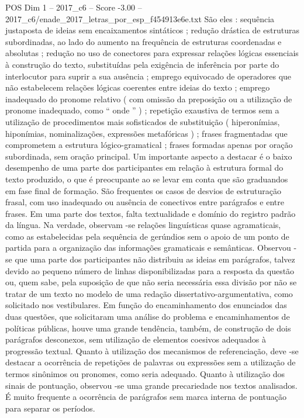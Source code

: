 \begin{textsample}{POS Dim 1 – 2017\_c6 – Score -3.00 – 2017\_c6/enade\_2017\_letras\_por\_esp\_f454913e6e.txt}
São eles : sequência justaposta de ideias sem encaixamentos sintáticos ; redução drástica de estruturas subordinadas, ao lado do aumento na frequência de estruturas coordenadas e absolutas ; redução no uso de conectores para expressar relações lógicas essenciais à construção do texto, substituídas pela exigência de inferência por parte do interlocutor para suprir a sua ausência ; emprego equivocado de operadores que não estabelecem relações lógicas coerentes entre ideias do texto ; emprego inadequado do pronome relativo ( com omissão da preposição ou a utilização de pronome inadequado, como “ onde ” ) ; repetição exaustiva de termos sem a utilização de procedimentos mais sofisticados de substituição ( hiperonímias, hiponímias, nominalizações, expressões metafóricas ) ; frases fragmentadas que comprometem a estrutura lógico-gramatical ; frases formadas apenas por oração subordinada, sem oração principal.
Um importante aspecto a destacar é o baixo desempenho de uma parte dos participantes em relação à estrutura formal do texto produzido, o que é preocupante ao se levar em conta que são graduandos em fase final de formação.
São frequentes os casos de desvios de estruturação frasal, com uso inadequado ou ausência de conectivos entre parágrafos e entre frases.
Em uma parte dos textos, falta textualidade e domínio do registro padrão da língua.
Na verdade, observam -se relações linguísticas quase agramaticais, como as estabelecidas pela sequência de gerúndios sem o apoio de um ponto de partida para a organização das informações gramaticais e semânticas.
Observou -se que uma parte dos participantes não distribuiu as ideias em parágrafos, talvez devido ao pequeno número de linhas disponibilizadas para a resposta da questão ou, quem sabe, pela suposição de que não seria necessária essa divisão por não se tratar de um texto no modelo de uma redação dissertativo-argumentativa, como solicitado nos vestibulares.
Em função do encaminhamento dos enunciados das duas questões, que solicitaram uma análise do problema e encaminhamentos de políticas públicas, houve uma grande tendência, também, de construção de dois parágrafos desconexos, sem utilização de elementos coesivos adequados à progressão textual.
Quanto à utilização dos mecanismos de referenciação, deve -se destacar a ocorrência de repetições de palavras ou expressões sem a utilização de termos sinônimos ou pronomes, como seria adequado.
Quanto à utilização dos sinais de pontuação, observou -se uma grande precariedade nos textos analisados.
É muito frequente a ocorrência de parágrafos sem marca interna de pontuação para separar os períodos.

\end{textsample}
